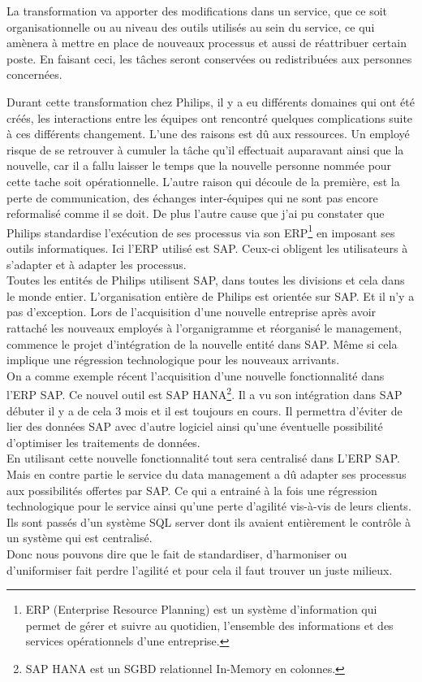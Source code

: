 \documentclass[12pt,a4paper]{article}
\begin{document}
La transformation va apporter des modifications dans un service, que ce soit organisationnelle ou au niveau des outils utilisés au sein du service, ce qui amènera à mettre en place de nouveaux processus et aussi de réattribuer certain poste. En faisant ceci, les tâches seront conservées ou redistribuées aux personnes concernées. 

Durant cette transformation chez Philips, il y a eu différents domaines qui ont été créés, les interactions entre les équipes ont rencontré quelques complications suite à ces différents changement. L'une des raisons est dû aux ressources. Un employé risque de se retrouver à cumuler la tâche qu'il effectuait auparavant ainsi que la nouvelle, car il a fallu laisser le temps que la nouvelle personne nommée pour cette tache soit opérationnelle. L'autre raison qui découle de la première, est la perte de communication, des échanges inter-équipes qui ne sont pas encore reformalisé comme il se doit. De plus l'autre cause que j'ai pu constater que Philips standardise l’exécution de ses processus via son ERP\footnote{ERP (Enterprise Resource Planning) est un système d’information qui permet de gérer et suivre au quotidien, l’ensemble des informations et des services opérationnels d’une entreprise.} en imposant ses outils informatiques. Ici l'ERP utilisé est SAP. Ceux-ci obligent les utilisateurs à s’adapter et à adapter les processus.\\

Toutes les entités de Philips utilisent SAP, dans toutes les divisions et cela dans le monde entier. L’organisation entière de Philips est orientée sur SAP. Et il n’y a pas d’exception. Lors de l’acquisition d’une nouvelle entreprise après avoir rattaché les nouveaux employés à l’organigramme et réorganisé le management, commence le projet d’intégration de la nouvelle entité dans SAP. Même si cela implique une régression technologique pour les nouveaux arrivants.\\ 

On a comme exemple récent l’acquisition d'une nouvelle fonctionnalité dans l'ERP SAP. Ce nouvel outil est SAP HANA\footnote{SAP HANA est un SGBD relationnel In-Memory en colonnes.}. Il a vu son intégration dans SAP débuter il y a de cela 3 mois et il est toujours en cours. Il permettra d'éviter de lier des données SAP avec d'autre logiciel ainsi qu'une éventuelle possibilité d'optimiser les traitements de données.\\
En utilisant cette nouvelle fonctionnalité tout sera centralisé dans L'ERP SAP. Mais en contre partie le service du data management a dû adapter ses processus aux possibilités offertes par SAP. Ce qui a entrainé à la fois une régression technologique pour le service ainsi qu’une perte d’agilité vis-à-vis de leurs clients. Ils sont passés d’un système SQL server dont ils avaient entièrement le contrôle à un système qui est centralisé.\\
Donc nous pouvons dire que le fait de standardiser, d'harmoniser ou d'uniformiser fait perdre l'agilité et pour cela il faut trouver un juste milieux.
\end{document}

